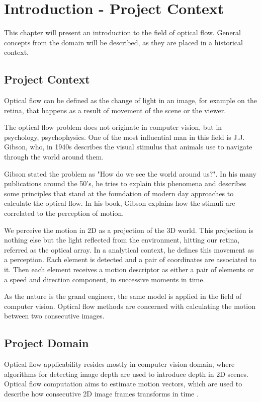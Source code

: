 \documentclass[12pt,a4paper,twoside]{report}
\begin{document}
\newpage

\tableofcontents
\newpage



\chapter{Introduction - Project Context}
\pagestyle{headings}

This chapter will present an introduction to the field of optical flow. General concepts from the domain will be described, as they are placed in a historical context.

\section{Project Context}

Optical flow can be defined as the change of light in an image, for example on the retina, that happens as a result of movement of the scene or the viewer.


The optical flow problem does not originate in computer vision, but in psychology, psychophysics. One of the most influential man in this field is J.J. Gibson, who, in 1940s describes the visual stimulus that animals use to navigate through the world around them. 

Gibson stated the problem as "How do we see the world around us?". In his many publications around the 50's, he tries to explain this phenomena and describes some principles that stand at the foundation of modern day approaches to calculate the optical flow. In his book\cite{gibson1950perception}, Gibson explains how the stimuli are correlated to the perception of motion. 

We perceive the motion in 2D as a projection of the 3D world. This projection is nothing else but the light reflected from the environment, hitting our retina, referred as the optical array. In a analytical context, he defines this movement as a perception. Each element is detected and a pair of coordinates are associated to it. Then each element receives a motion descriptor as either a pair of elements or a speed and direction component, in successive moments in time. 

As the nature is the grand engineer, the same model is applied in the field of computer vision. Optical flow methods are concerned with calculating the motion between two consecutive images. 

\section{Project Domain}
Optical flow applicability resides mostly in computer vision domain, where algorithms for detecting image depth are used to introduce depth in 2D scenes. Optical flow computation  aims to estimate motion vectors, which are used to describe how consecutive 2D image frames transforms in time . 
\end{document}
